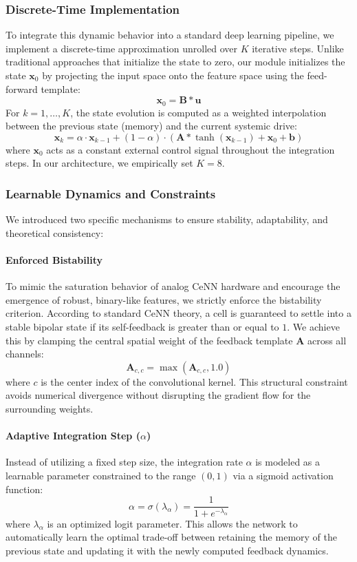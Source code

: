 \documentclass[a4paper,fleqn]{cas-dc}
\begin{document}
\subsubsection{Discrete-Time Implementation}To integrate this dynamic behavior into a standard deep learning pipeline, we implement a discrete-time approximation unrolled over $K$ iterative steps. Unlike traditional approaches that initialize the state to zero, our module initializes the state $\mathbf{x}_0$ by projecting the input space onto the feature space using the feed-forward template:$$\mathbf{x}_0 = \mathbf{B} \ast \mathbf{u}$$For $k = 1, \dots, K$, the state evolution is computed as a weighted interpolation between the previous state (memory) and the current systemic drive:$$\mathbf{x}_k = \alpha \cdot \mathbf{x}_{k-1} + (1 - \alpha) \cdot \left( \mathbf{A} \ast \tanh(\mathbf{x}_{k-1}) + \mathbf{x}_0 + \mathbf{b} \right)$$where $\mathbf{x}_0$ acts as a constant external control signal throughout the integration steps. In our architecture, we empirically set $K=8$.

\subsubsection{Learnable Dynamics and Constraints}We introduced two specific mechanisms to ensure stability, adaptability, and theoretical consistency:
\paragraph{Enforced Bistability}To mimic the saturation behavior of analog CeNN hardware and encourage the emergence of robust, binary-like features, we strictly enforce the bistability criterion. According to standard CeNN theory, a cell is guaranteed to settle into a stable bipolar state if its self-feedback is greater than or equal to $1$. We achieve this by clamping the central spatial weight of the feedback template $\mathbf{A}$ across all channels:$$\mathbf{A}_{c,c} = \max(\mathbf{A}_{c,c}, 1.0)$$where $c$ is the center index of the convolutional kernel. This structural constraint avoids numerical divergence without disrupting the gradient flow for the surrounding weights.
\paragraph{Adaptive Integration Step ($\alpha$)}Instead of utilizing a fixed step size, the integration rate $\alpha$ is modeled as a learnable parameter constrained to the range $(0, 1)$ via a sigmoid activation function:$$\alpha = \sigma(\lambda_{\alpha}) = \frac{1}{1 + e^{-\lambda_{\alpha}}}$$where $\lambda_{\alpha}$ is an optimized logit parameter. This allows the network to automatically learn the optimal trade-off between retaining the memory of the previous state and updating it with the newly computed feedback dynamics.
\end{document}
